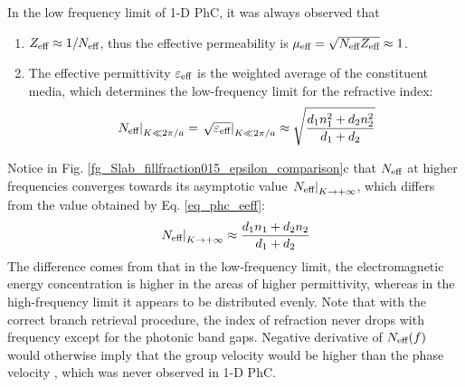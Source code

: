 In the low frequency limit of 1-D PhC, it was always observed that
\begin{enumerate}
\item{$Z_{\text{eff} } \approx 1/N_{\text{eff} }$, thus the effective permeability is $\mu_{\text{eff} } = \sqrt{N_{\text{eff} }Z_{\text{eff} }} \approx 1$.} 
\item{The effective permittivity $\varepsilon_{\text{eff} }$ is the weighted average of the constituent media, which determines the low-frequency limit for the refractive index:
	\begin{equation} \left.N_{\text{eff} }\right|_{K\ll 2\pi/a} =\left. \sqrt{\varepsilon_{\text{eff} }}\right|_{K\ll 2\pi/a} \approx \sqrt{\frac{d_1 n_1^{2} + d_2 n_2^{2}}{d_1+d_2}} \label{eq_phc_eeff}\end{equation}
	}
\end{enumerate}
Notice in Fig. \ref{fg_Slab_fillfraction015_epsilon_comparison}c that $N_{\text{eff} }$ at higher frequencies converges towards its asymptotic value $\left.N_{\text{eff} }\right|_{K\rightarrow +\infty}$, which differs from the value obtained by Eq. \ref{eq_phc_eeff}:
\begin{equation} \left.N_{\text{eff} }\right|_{K\rightarrow +\infty} \approx \frac{d_1 n_1 + d_2 n_2}{d_1+d_2} \label{eq_phc_neff}\end{equation}
The difference comes from that in the low-frequency limit, the electromagnetic energy concentration is higher in the areas of higher permittivity, whereas in the high-frequency limit it appears to be distributed evenly.
Note that with the correct branch retrieval procedure, the index of refraction never drops with frequency except for the photonic band gaps. Negative derivative of $N_{\text{eff} }(f)$ would otherwise imply that the group velocity would be higher than the phase velocity \cite{mikki2009electromagnetic}, which was never observed in 1-D PhC.


